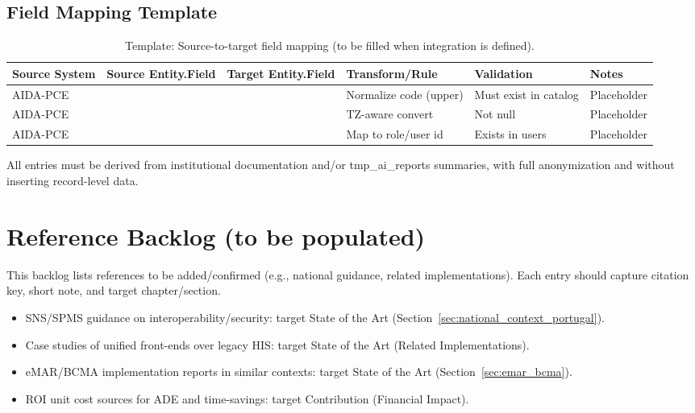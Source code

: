 \subsection{Field Mapping Template}
\begin{table}[H]
    \centering
    \caption{Template: Source-to-target field mapping (to be filled when integration is defined).}
    \label{tab:template_field_mapping}
    {\setlength{\tabcolsep}{2.5pt}\small
    \begin{tabularx}{\textwidth}{@{}P{2.2cm} P{2.7cm} P{2.7cm} P{2.2cm} P{2.1cm} Y@{}}
        \toprule
        \textbf{Source System} & \textbf{Source Entity.\-Field} & \textbf{Target Entity.\-Field} & \textbf{Transform/\-Rule} & \textbf{Validation} & \textbf{Notes} \\
        \midrule
        AIDA-PCE &  &  & Normalize code (upper) & Must exist in catalog & Placeholder \\
        AIDA-PCE &  &  & TZ-aware convert & Not null & Placeholder \\
        AIDA-PCE &  &  & Map to role/user id & Exists in users & Placeholder \\
        \bottomrule
    \end{tabularx}}
\end{table}

All entries must be derived from institutional documentation and/or tmp\_ai\_reports summaries, with full anonymization and without inserting record-level data.

\section{Reference Backlog (to be populated)}
This backlog lists references to be added/confirmed (e.g., national guidance, related implementations). Each entry should capture citation key, short note, and target chapter/section.
\begin{itemize}
    \item SNS/SPMS guidance on interoperability/security: target State of the Art (Section~\ref{sec:national_context_portugal}).
    \item Case studies of unified front-ends over legacy HIS: target State of the Art (Related Implementations).
    \item eMAR/BCMA implementation reports in similar contexts: target State of the Art (Section~\ref{sec:emar_bcma}).
    \item ROI unit cost sources for ADE and time-savings: target Contribution (Financial Impact).
\end{itemize}